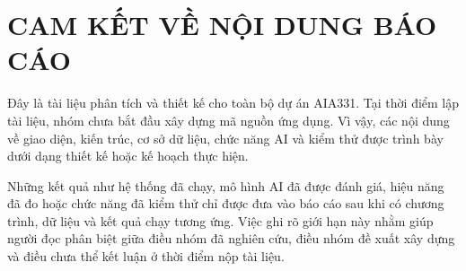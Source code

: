 \chapter*{CAM KẾT VỀ NỘI DUNG BÁO CÁO}

Đây là tài liệu phân tích và thiết kế cho toàn bộ dự án AIA331. Tại thời điểm lập tài liệu, nhóm chưa bắt đầu xây dựng mã nguồn ứng dụng. Vì vậy, các nội dung về giao diện, kiến trúc, cơ sở dữ liệu, chức năng AI và kiểm thử được trình bày dưới dạng thiết kế hoặc kế hoạch thực hiện.

Những kết quả như hệ thống đã chạy, mô hình AI đã được đánh giá, hiệu năng đã đo hoặc chức năng đã kiểm thử chỉ được đưa vào báo cáo sau khi có chương trình, dữ liệu và kết quả chạy tương ứng. Việc ghi rõ giới hạn này nhằm giúp người đọc phân biệt giữa điều nhóm đã nghiên cứu, điều nhóm đề xuất xây dựng và điều chưa thể kết luận ở thời điểm nộp tài liệu.
